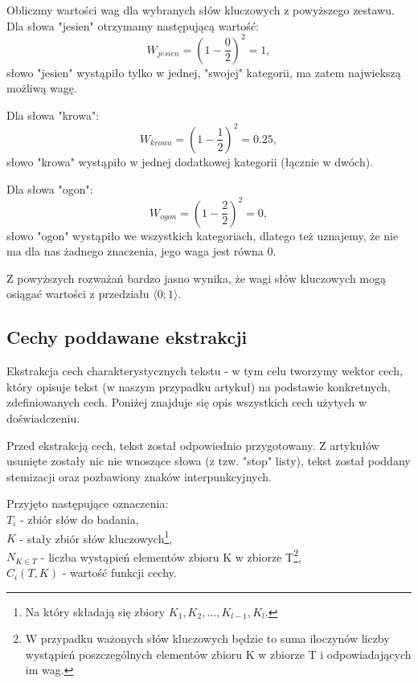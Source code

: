 \documentclass{classrep}
\begin{document}
Obliczmy wartości wag dla wybranych słów kluczowych z powyższego zestawu. Dla słowa "jesien" otrzymamy następującą wartość:
\begin{equation}
            W_{jesien} = \left({1 - \frac{0}{2}}\right)^2 = 1,
\end{equation}
słowo "jesien" wystąpiło tylko w jednej, "swojej" kategorii, ma zatem najwiekszą możliwą wagę.

Dla słowa "krowa":
\begin{equation}
            W_{krowa} = \left({1 - \frac{1}{2}}\right)^2 = 0.25,
\end{equation}
słowo "krowa" wystąpiło w jednej dodatkowej kategorii (łącznie w dwóch).

Dla słowa "ogon":
\begin{equation}
            W_{ogon} = \left({1 - \frac{2}{2}}\right)^2 = 0,
\end{equation}
słowo "ogon" wystąpiło we wszystkich kategoriach, dlatego też uznajemy, że nie ma dla nas żadnego znaczenia, jego waga jest równa 0. \newline

Z powyższych rozważań bardzo jasno wynika, że wagi słów kluczowych mogą osiągać wartości z przedziału $ \langle0;1\rangle $.


\subsection{Cechy poddawane ekstrakcji}

Ekstrakcja cech charakterystycznych tekstu - w tym celu tworzymy wektor cech, który opisuje tekst (w naszym przypadku artykuł) na podstawie konkretnych, zdefiniowanych cech. Poniżej znajduje się opis wszystkich cech użytych w doświadczeniu. \newline

Przed ekstrakcją cech, tekst został odpowiednio przygotowany. Z artykułów usunięte zostały nic nie wnoszące słowa (z tzw. "stop" listy), tekst został poddany stemizacji oraz pozbawiony znaków interpunkcyjnych. \newline

Przyjęto następujące oznaczenia:\\
    \quad $T_{i}$ - zbiór słów do badania,\\
    \quad $K$ - stały zbiór słów kluczowych\footnote{Na który składają się zbiory ${K_{1}, K_{2}, \ldots , K_{l-1}, K_{l}.}$}, \\
    \quad $N_{K \in T}$ - liczba wystąpień elementów zbioru K w zbiorze T\footnote{W przypadku ważonych słów kluczowych będzie to suma iloczynów liczby wystąpień poszczególnych elementów zbioru K w zbiorze T i odpowiadających im wag.}, \\
    \quad $C_{i}(T,K)$ - wartość funkcji cechy. \\
\end{document}
